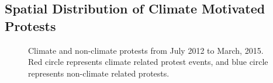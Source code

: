 \documentclass[9pt,twocolumn,twoside]{pnas-new}
\begin{document}
\subsection{Spatial Distribution of Climate Motivated Protests}
\begin{figure}[ht]
	\centering
	\caption{Climate and non-climate protests from July 2012 to March, 2015. Red circle represents climate related protest events, and blue circle represents non-climate related protests. }
\label{climate-map}
\end{figure}
\end{document}
